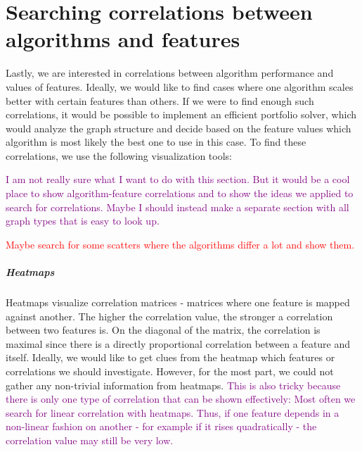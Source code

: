 \iffalse
\section{Searching correlations between algorithms and features}
Lastly, we are interested in correlations between algorithm performance and values of features.
Ideally, we would like to find cases where one algorithm scales better with certain features than others.
If we were to find enough such correlations, it would be possible to implement an efficient portfolio solver, which
would analyze the graph structure and decide based on the feature values which algorithm is most likely the best one to use in this case.
To find these correlations, we use the following visualization tools:

\textcolor{purple}{I am not really sure what I want to do with this section. 
But it would be a cool place to show algorithm-feature correlations and to show the ideas we applied to search for correlations.
Maybe I should instead make a separate section with all graph types that is easy to look up.}

\textcolor{red}{Maybe search for some scatters where the algorithms differ a lot and show them.}

\subparagraph*{Heatmaps}
Heatmaps visualize correlation matrices - matrices where one feature is mapped against another. The higher the correlation value, the stronger
a correlation between two features is. On the diagonal of the matrix, the correlation is maximal since there is a directly proportional correlation between
a feature and itself. Ideally, we would like to get clues from the heatmap which features or correlations we should investigate.
However, for the most part, we could not gather any non-trivial information from heatmaps. \textcolor{purple}{This is also tricky because
there is only one type of correlation that can be shown effectively: Most often we search for linear correlation with heatmaps. Thus,
if one feature depends in a non-linear fashion on another - for example if it rises quadratically - the correlation value may still be very low.}

